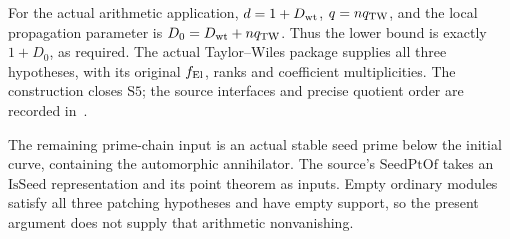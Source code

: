 For the actual arithmetic application,
\(d=1+D_{\rm wt}\), \(q=nq_{\rm TW}\), and the local
propagation parameter is \(D_0=D_{\rm wt}+nq_{\rm TW}\).
Thus the lower bound is exactly \(1+D_0\), as required.
The actual Taylor--Wiles package supplies all three hypotheses,
with its original \(f_{\rm El}\), ranks and coefficient
multiplicities.  The construction closes \(\mathrm{S5}\);
the source interfaces and precise quotient order are recorded
in~\cite{SelmerPatchedSupportSource}.

The remaining prime-chain input is an actual stable seed prime
below the initial curve, containing the automorphic annihilator.
The source's \(\mathrm{SeedPtOf}\) takes an
\(\mathrm{IsSeed}\) representation and its point theorem as
inputs.  Empty ordinary modules satisfy all three patching
hypotheses and have empty support, so the present argument
does not supply that arithmetic nonvanishing.
